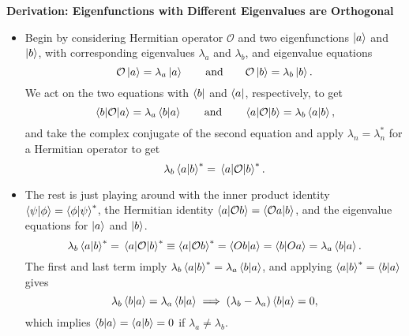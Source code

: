 \documentclass[11pt, a4paper]{article}
\newcommand{\eqtext}[1]{\qquad \text{#1} \qquad}
\newcommand{\Herm}{Hermitian\xspace}
\renewcommand{\O}{\mathcal{O}}  %
\newcommand{\p}{\psi}  %
\begin{document}
\textbf{Derivation: Eigenfunctions with Different Eigenvalues are Orthogonal}
\begin{itemize}

    \item Begin by considering \Herm operator $ \O $ and two eigenfunctions $ \ket{a} $ and $ \ket{b} $, with corresponding eigenvalues $ \lambda_{a} $ and $ \lambda_{b} $, and eigenvalue equations
	\begin{equation*}
		\O \ket{a} = \lambda_{a}\ket{a} \eqtext{and} \O \ket{b} = \lambda_{b}\ket{b}.
	\end{equation*}
	We act on the two equations with $ \bra{b} $ and $ \bra{a} $, respectively, to get
	\begin{equation*}
		\mel{b}{\O}{a} = \lambda_{a}\braket{b}{a} \eqtext{and} \mel{a}{\O}{b} = \lambda_{b}\braket{a}{b},
	\end{equation*}
	and take the complex conjugate of the second equation and apply $ \lambda_{n} = \lambda_{n}^{*} $ for a \Herm operator to get 
	\begin{equation*}
        \lambda_{b}\braket{a}{b}^{*} = \mel{a}{\O}{b}^{*}.
	\end{equation*}

	\item The rest is just playing around with the inner product identity $ \braket{\p}{\phi} = \braket{\phi}{\p}^{*} $, the \Herm identity $ \braket{a}{\O b} = \braket{\O a}{b} $, and the eigenvalue equations for $ \ket{a} $ and $ \ket{b} $. 
	\begin{equation*}
		\lambda_{b}\braket{a}{b}^{*} = \mel{a}{\O}{b}^{*} \equiv \braket{a}{\O b}^{*} = \braket{Ob}{a} = \braket{b}{Oa} = \lambda_{a}\braket{b}{a}.
	\end{equation*}
    The first and last term imply $ \lambda_{b}\braket{a}{b}^{*} = \lambda_{a}\braket{b}{a} $, and applying $ \braket{a}{b}^{*} = \braket{b}{a} $ gives
	\begin{equation*}
		\lambda_{b}\braket{b}{a} = \lambda_{a}\braket{b}{a} \implies (\lambda_{b} - \lambda_{a}) \braket{b}{a} = 0,
	\end{equation*}
    which implies $ \braket{b}{a} = \braket{a}{b} = 0 $ if $ \lambda_{a} \neq \lambda_{b} $.
\end{itemize}
\end{document}
